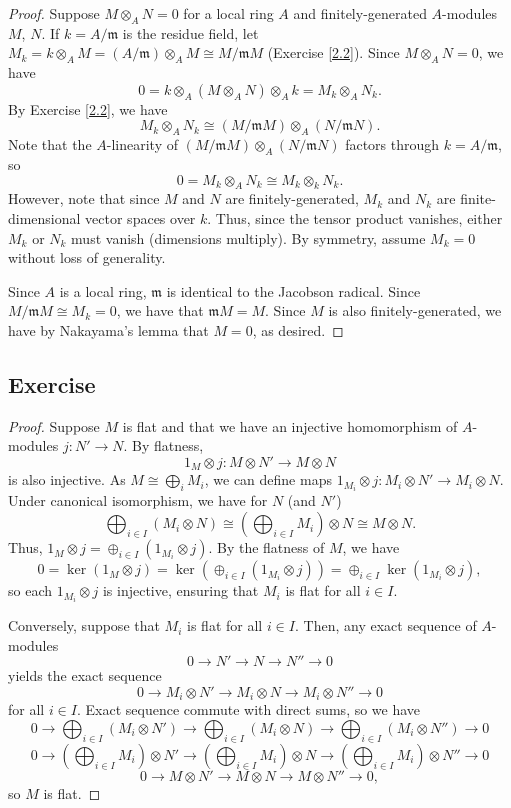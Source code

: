 \begin{proof}
Suppose $M \otimes_A N = 0$ for a local ring $A$ and finitely-generated $A$-modules $M$, $N$. If $k = A/\mathfrak{m}$ is the residue field,
let $M_k = k \otimes_A M = (A/\mathfrak{m}) \otimes_A M \cong M / \mathfrak{m}M$ (Exercise \ref{2.2}). Since $M\otimes_A N = 0$, we have
$$0 = k \otimes_A (M \otimes_A N) \otimes_A k = M_k \otimes_A N_k.$$
By Exercise \ref{2.2}, we have
$$M_k \otimes_A N_k \cong (M/\mathfrak{m}M) \otimes_A (N/\mathfrak{m}N).$$
Note that the $A$-linearity of $(M/\mathfrak{m}M) \otimes_A (N/\mathfrak{m}N)$ factors through $k = A/\mathfrak{m}$, so
$$0 = M_k \otimes_A N_k \cong M_k \otimes_k N_k.$$
However, note that since $M$ and $N$ are finitely-generated, $M_k$ and $N_k$ are finite-dimensional vector spaces over $k$. Thus, since the
tensor product vanishes, either $M_k$ or $N_k$ must vanish (dimensions multiply). By symmetry, assume $M_k = 0$ without loss of generality.

Since $A$ is a local ring, $\mathfrak{m}$ is identical to the Jacobson radical. Since $M/\mathfrak{m}M \cong M_k = 0$, we have that
$\mathfrak{m}M = M$. Since $M$ is also finitely-generated, we have by Nakayama's lemma that $M = 0$, as desired.
\end{proof}

\subsection{Exercise}\label{2.4} %

\begin{proof}
Suppose $M$ is flat and that we have an injective homomorphism of $A$-modules $j : N' \to N$. By flatness,
$$1_M \otimes j : M \otimes N' \to M \otimes N$$
is also injective. As $M \cong \bigoplus_i M_i$, we can define maps $1_{M_i} \otimes j : M_i \otimes N' \to M_i \otimes N$. Under canonical isomorphism, we have for
$N$ (and $N'$)
$$\bigoplus_{i \in I} (M_i \otimes N) \cong \left(\bigoplus_{i \in I} M_i\right) \otimes N \cong M \otimes N.$$
Thus, $1_M \otimes j = \oplus_{i\in I}(1_{M_{i}} \otimes j)$. By the flatness of $M$, we have
$$0 = \ker (1_M \otimes j) = \ker \left(\oplus_{i\in I} (1_{M_{i}} \otimes j)\right) = \oplus_{i\in I}\ker (1_{M_{i}} \otimes j),$$
so each $1_{M_{i}} \otimes j$ is injective, ensuring that $M_i$ is flat for all $i \in I$.

Conversely, suppose that $M_i$ is flat for all $i \in I$. Then, any exact sequence of $A$-modules
$$0 \to N' \to N \to N'' \to 0$$
yields the exact sequence
$$0 \to M_i \otimes N' \to M_i \otimes N \to M_i \otimes N'' \to 0$$
for all $i \in I$. Exact sequence commute with direct sums, so we have
$$0 \to \bigoplus_{i\in I}(M_i \otimes N') \to \bigoplus_{i\in I}(M_i \otimes N) \to \bigoplus_{i\in I}(M_i \otimes N'') \to 0$$
$$0 \to \left(\bigoplus_{i\in I}M_i\right) \otimes N' \to \left(\bigoplus_{i\in I}M_i\right) \otimes N \to \left(\bigoplus_{i\in I}M_i\right) \otimes N'' \to 0$$
$$0 \to M \otimes N' \to M \otimes N \to M \otimes N'' \to 0,$$
so $M$ is flat.
\end{proof}

